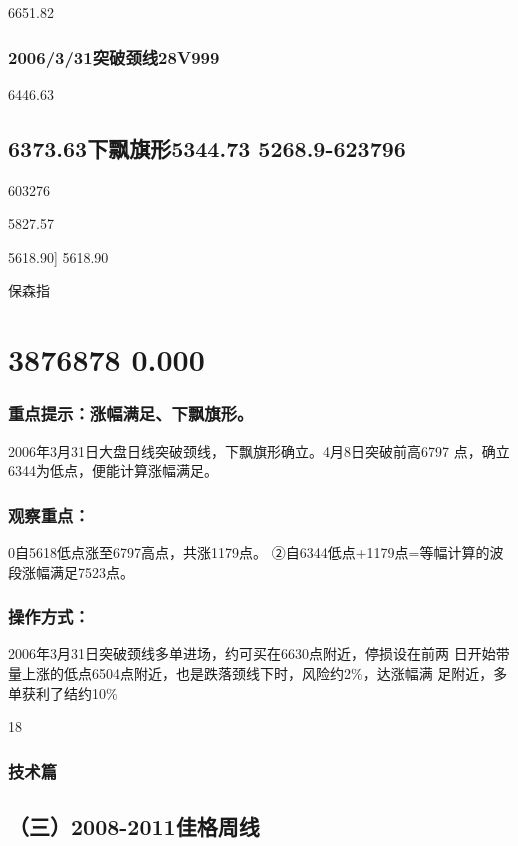 \documentclass{article}
\begin{document}
6651.82

\subsubsection{2006/3/31突破颈线28V999}

6446.63

\subsection{6373.63下飘旗形5344.73 5268.9-623796}

603276

5827.57

5618.90] 5618.90

保森指

\section{3876878 0.000}

\subsubsection{重点提示：涨幅满足、下飘旗形。}

2006年3月31日大盘日线突破颈线，下飘旗形确立。4月8日突破前高6797 点，确立6344为低点，便能计算涨幅满足。

\subsubsection{观察重点：}

0自5618低点涨至6797高点，共涨1179点。 ②自6344低点+1179点=等幅计算的波段涨幅满足7523点。

\subsubsection{操作方式：}

2006年3月31日突破颈线多单进场，约可买在6630点附近，停损设在前两 日开始带量上涨的低点6504点附近，也是跌落颈线下时，风险约2\%，达涨幅满 足附近，多单获利了结约10\%

18

\clearpage

\subsubsection{技术篇}

\subsection{（三）2008-2011佳格周线}
\end{document}
